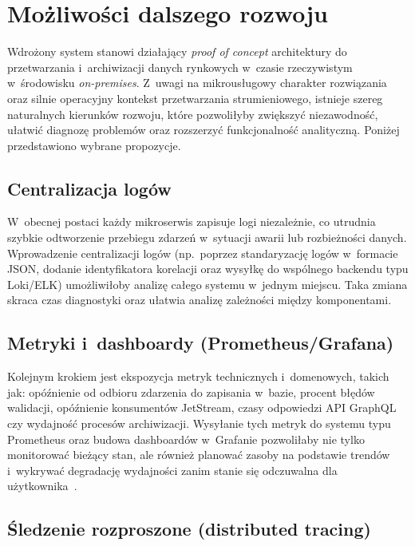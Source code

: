 \section{Możliwości dalszego rozwoju}
\label{sec:rozwoj}

Wdrożony system stanowi działający \textit{proof of concept} architektury do przetwarzania i~archiwizacji danych
rynkowych w~czasie rzeczywistym w~środowisku \textit{on-premises}.
Z~uwagi na mikrousługowy charakter rozwiązania oraz silnie operacyjny kontekst przetwarzania strumieniowego,
istnieje szereg naturalnych kierunków rozwoju, które pozwoliłyby zwiększyć niezawodność, ułatwić diagnozę
problemów oraz rozszerzyć funkcjonalność analityczną.
Poniżej przedstawiono wybrane propozycje.

\subsection{Centralizacja logów}

W~obecnej postaci każdy mikroserwis zapisuje logi niezależnie, co utrudnia szybkie odtworzenie przebiegu zdarzeń
w~sytuacji awarii lub rozbieżności danych.
Wprowadzenie centralizacji logów (np.\ poprzez standaryzację logów w~formacie JSON, dodanie identyfikatora korelacji
oraz wysyłkę do wspólnego backendu typu Loki/ELK) umożliwiłoby analizę całego systemu w~jednym miejscu.
Taka zmiana skraca czas diagnostyki oraz ułatwia analizę zależności między komponentami.

\subsection[Metryki i dashboardy (Prometheus/Grafana)]{Metryki i~dashboardy (Prometheus/Grafana)}

Kolejnym krokiem jest ekspozycja metryk technicznych i~domenowych, takich jak: opóźnienie od odbioru zdarzenia do
zapisania w~bazie, procent błędów walidacji, opóźnienie konsumentów JetStream, czasy odpowiedzi API GraphQL czy wydajność
procesów archiwizacji.
Wysyłanie tych metryk do systemu typu Prometheus oraz budowa dashboardów w~Grafanie pozwoliłaby nie tylko
monitorować bieżący stan, ale również planować zasoby na podstawie trendów i~wykrywać degradację wydajności zanim
stanie się odczuwalna dla użytkownika~\cite{prometheus_grafana}.

\subsection{Śledzenie rozproszone (distributed tracing)}

